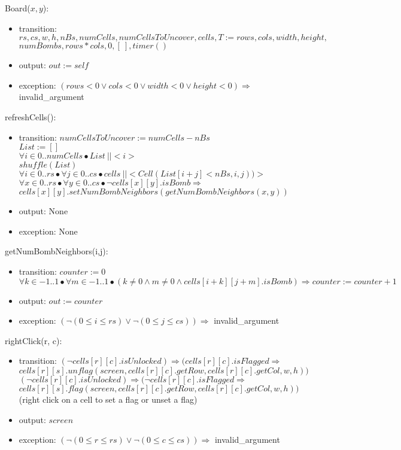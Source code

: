 \documentclass[12pt]{article}
\begin{document}
Board($x, y$):
\begin{itemize}
\item transition: $rs, cs, w, h, nBs, numCells, numCellsToUncover, cells, T := rows, cols, width, height, $\\$numBombs, rows*cols,0,[\ ], timer()$
\item output: $out := \mathit{self}$
\item exception: $(rows < 0 \lor cols < 0 \lor width<0 \lor height<0) \Rightarrow$ invalid\_argument
\end{itemize}

\noindent refreshCells():
\begin{itemize}
\item transition: $numCellsToUncover := numCells - nBs$\\
$List := []$\\
$\forall i \in 0..numCells \bullet List\ ||<i>$\\
$shuffle(List)$\\
$\forall i \in 0..rs \bullet \forall j \in 0..cs \bullet cells\ ||<Cell(List[i+j]<nBs,i,j))>$\\
$\forall x \in 0..rs \bullet \forall y \in 0..cs \bullet \neg cells[x][y].isBomb \Rightarrow$\\$ cells[x][y].setNumBombNeighbors(getNumBombNeighbors(x,y))$
\item output: None
\item exception: None
\end{itemize}

\noindent getNumBombNeighbors(i,j):
\begin{itemize}
\item transition: $counter := 0$\\
$\forall k \in -1..1 \bullet \forall m \in -1..1 \bullet (k\neq0 \land m \neq 0 \land cells[i+k][j+m].isBomb)\Rightarrow counter:=counter+1$
\item output: $out := counter$
\item exception: $(\neg (0\leq i\leq rs) \lor \neg (0\leq j\leq cs))\Rightarrow$ invalid\_argument
\end{itemize}

\noindent rightClick(r, c):
\begin{itemize}
\item transition: $(\neg cells[r][c].isUnlocked)\Rightarrow (cells[r][c].isFlagged \Rightarrow$\\$ cells[r][s].unflag(screen,cells[r][c].getRow,cells[r][c].getCol,w,h))$\\
$(\neg cells[r][c].isUnlocked)\Rightarrow (\neg cells[r][c].isFlagged \Rightarrow$\\$ cells[r][s].flag(screen,cells[r][c].getRow,cells[r][c].getCol,w,h))$\\
(right click on a cell to set a flag or unset a flag)
\item output: $screen$
\item exception: $(\neg (0\leq r\leq rs) \lor \neg (0\leq c\leq cs))\Rightarrow$ invalid\_argument
\end{itemize}
\end{document}
